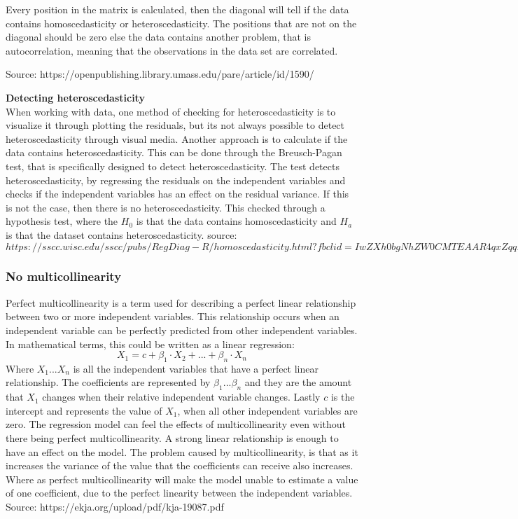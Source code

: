 Every position in the matrix is calculated, then the diagonal will tell if the data contains homoscedasticity or heteroscedasticity. The positions that are not on the diagonal should be zero else the data contains another problem, that is autocorrelation, meaning that the observations in the data set are correlated.

Source: https://openpublishing.library.umass.edu/pare/article/id/1590/

\noindent \textbf{Detecting heteroscedasticity} \\
When working with data, one method of checking for heteroscedasticity is to visualize it through plotting the residuals, but its not always possible to detect heteroscedasticity through visual media. Another approach is to calculate if the data contains heteroscedasticity. This can be done through the Breusch-Pagan test, that is specifically designed to detect heteroscedasticity. The test detects heteroscedasticity, by regressing the residuals on the independent variables and checks if the independent variables has an effect on the residual variance. If this is not the case, then there is no heteroscedasticity. This checked through a hypothesis test, where the $H_0$ is that the data contains homoscedasticity and $H_a$ is that the dataset contains heteroscedasticity.
source: $https://sscc.wisc.edu/sscc/pubs/RegDiag-R/homoscedasticity.html?fbclid=IwZXh0bgNhZW0CMTEAAR4qxZqqD0CVoqZfHgWZU8lUOuxg43dFRSs9Opswn-IAo8l-UaO1oDWCuUfkvw_aem_9Ft7wkFWKUHycQ1GnX-x0g$

\subsubsection{No multicollinearity}
Perfect multicollinearity is a term used for describing a perfect linear relationship between two or more independent variables. This relationship occurs when an independent variable can be perfectly predicted from other independent variables. In mathematical terms, this could be written as a linear regression:
$$
X_1 = c+\beta_1\cdot X_2+...+\beta_n\cdot X_n
$$ 
Where $X_1...X_n$ is all the independent variables that have a perfect linear relationship. The coefficients are represented by $\beta_1...\beta_n$ and they are the amount that $X_1$ changes when their relative independent variable changes.
Lastly $c$ is the intercept and represents the value of $X_1$, when all other independent variables are zero.
\newline
The regression model can feel the effects of multicollinearity even without there being perfect multicollinearity. A strong linear relationship is enough to have an effect on the model. The problem caused by multicollinearity, is that as it increases the variance of the value that the coefficients can receive also increases. Where as perfect multicollinearity will make the model unable to estimate a value of one coefficient, due to the perfect linearity between the independent variables.
\newline
Source: https://ekja.org/upload/pdf/kja-19087.pdf

